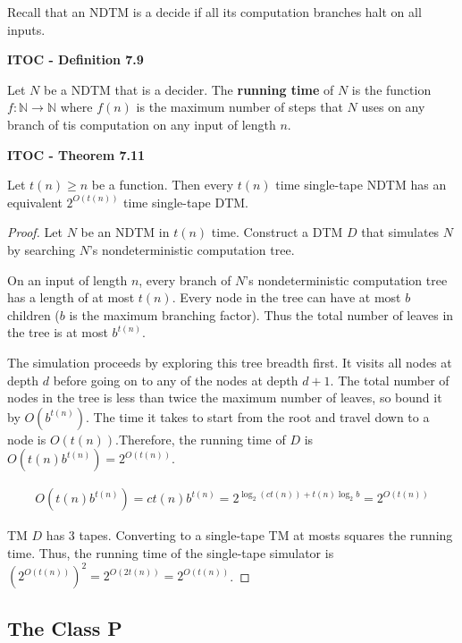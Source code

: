 Recall that an NDTM is a decide if all its computation branches halt on all inputs.

\begin{shaded}
\textbf{ITOC - Definition 7.9}

\medskip
Let $N$ be a NDTM that is a decider. The \textbf{running time} of $N$ is the function $f:\mathbb{N}\rightarrow \mathbb{N}$ where $f(n)$ is the maximum number of steps that $N$ uses on any branch of tis computation on any input of length $n$.
\end{shaded}

\begin{shaded}
\textbf{ITOC - Theorem 7.11}

\medskip
Let $t(n) \geq n$ be a function. Then every $t(n)$ time single-tape NDTM has an equivalent $2^{O(t(n))}$ time single-tape DTM.
\end{shaded}

\begin{mdframed}
\begin{proof}
Let $N$ be an NDTM in $t(n)$ time. Construct a DTM $D$ that simulates $N$ by searching $N$'s nondeterministic computation tree.

\medskip
On an input of length $n$, every branch of $N$'s nondeterministic computation tree has a length of at most $t(n)$. Every node in the tree can have at most $b$ children ($b$ is the maximum branching factor). Thus the total number of leaves in the tree is at most $b^{t(n)}$.

\medskip
The simulation proceeds by exploring this tree breadth first. It visits all nodes at depth $d$ before going on to any of the nodes at depth $d+1$. The total number of nodes in the tree is less than twice the maximum number of leaves, so bound it by $O(b^{t(n)})$. The time it takes to start from the root and travel down to a node is $O(t(n))$.Therefore, the running time of $D$ is $O(t(n)b^{t(n)}) = 2^{O(t(n))}$. 

\begin{align*}
O(t(n) b^{t(n)}) = c t(n) b^{t(n)} = 2^{\log_2 (ct(n)) + t(n)\log_2 b} = 2^{O(t(n))}
\end{align*}

TM $D$ has 3 tapes. Converting to a single-tape TM at mosts squares the running time. Thus, the running time of the single-tape simulator is $(2^{O(t(n))})^2 = 2^{O(2t(n))} = 2^{O(t(n))}$.
\end{proof}
\end{mdframed}

\subsection{The Class P}

